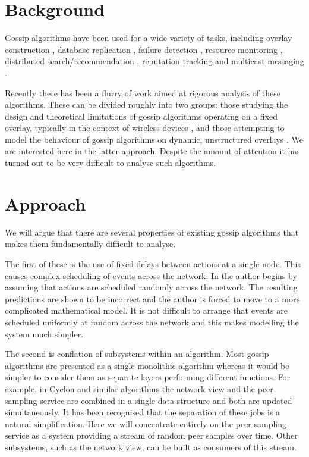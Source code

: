 \documentclass[a4paper,10pt]{article}
\begin{document}
\section{Background}

Gossip algorithms have been used for a wide variety of tasks, including overlay construction \cite{Cyclon}, database replication \cite{database_replication}, failure detection \cite{failure_detection}, resource monitoring \cite{astrolabe}, distributed search/recommendation \cite{tribler}, reputation tracking \cite{reputation} and multicast messaging \cite{multicast}. 

Recently there has been a flurry of work aimed at rigorous analysis of these algorithms. These can be divided roughly into two groups: those studying the design and theoretical limitations of gossip algorithms operating on a fixed overlay, typically in the context of wireless devices \cite{sensorish1, sensorish2}, and those attempting to model the behaviour of gossip algorithms on dynamic, unstructured overlays \cite{generic_theory, mean_field, gossip_prism, correctness, random_scheduling}. We are interested here in the latter approach. Despite the amount of attention it has turned out to be very difficult to analyse such algorithms. 

\section{Approach}

We will argue that there are several properties of existing gossip algorithms that makes them fundamentally difficult to analyse.

The first of these is the use of fixed delays between actions at a single node. This causes complex scheduling of events across the network. In \cite{random_scheduling} the author begins by assuming that actions are scheduled randomly across the network. The resulting predictions are shown to be incorrect and the author is forced to move to a more complicated mathematical model. It is not difficult to arrange that events are scheduled uniformly at random across the network and this makes modelling the system much simpler.

The second is conflation of subsystems within an algorithm. Most gossip algorithms are presented as a single monolithic algorithm whereas it would be simpler to consider them as separate layers performing different functions. For example, in Cyclon and similar algorithms the network view and the peer sampling service are combined in a single data structure and both are updated simultaneously. It has been recognised \cite{pss, generic_theory} that the separation of these jobs is a natural simplification. Here we will concentrate entirely on the peer sampling service as a system providing a stream of random peer samples over time. Other subsystems, such as the network view, can be built as consumers of this stream.
\end{document}
